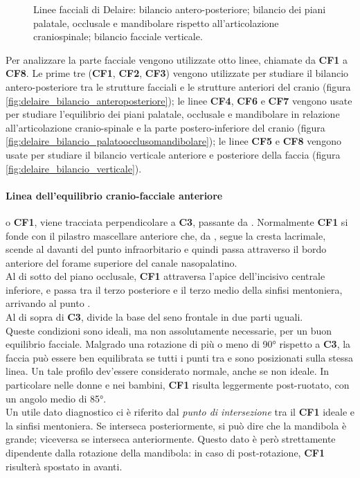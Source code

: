 \begin{figure}[!ht]
\caption{Linee facciali di Delaire:  bilancio antero-posteriore;  bilancio dei piani palatale, occlusale e mandibolare rispetto all'articolazione craniospinale;  bilancio facciale verticale.}
\label{fig:delaire_facciali}
\end{figure}

Per analizzare la parte facciale vengono utilizzate otto linee, chiamate da \textbf{CF1} a \textbf{CF8}. Le prime tre (\textbf{CF1}, \textbf{CF2}, \textbf{CF3}) vengono utilizzate per studiare il bilancio antero-posteriore tra le strutture facciali e le strutture anteriori del cranio (figura \vref{fig:delaire_bilancio_anteroposteriore}); le linee \textbf{CF4}, \textbf{CF6} e \textbf{CF7} vengono usate per studiare l'equilibrio dei piani palatale, occlusale e mandibolare in relazione all'articolazione cranio-spinale e la parte postero-inferiore del cranio (figura \vref{fig:delaire_bilancio_palatoocclusomandibolare}); le linee \textbf{CF5} e \textbf{CF8} vengono usate per studiare il bilancio verticale anteriore e posteriore della faccia (figura \vref{fig:delaire_bilancio_verticale}).

\paragraph{Linea dell'equilibrio cranio-facciale anteriore} o \textbf{CF1}, viene tracciata perpendicolare a \textbf{C3}, passante da . Normalmente \textbf{CF1} si fonde con il pilastro mascellare anteriore che, da , segue la cresta lacrimale, scende al davanti del punto infraorbitario e quindi passa attraverso il bordo anteriore del forame superiore del canale nasopalatino. \\ Al di sotto del piano occlusale, \textbf{CF1} attraversa l'apice dell'incisivo centrale inferiore, e passa tra il terzo posteriore e il terzo medio della sinfisi mentoniera, arrivando al punto . \\ Al di sopra di \textbf{C3}, divide la base del seno frontale in due parti uguali. \\ Queste condizioni sono ideali, ma non assolutamente necessarie, per un buon equilibrio facciale. Malgrado una rotazione di più o meno di 90° rispetto a \textbf{C3}, la faccia può essere ben equilibrata se tutti i punti tra  e  sono posizionati sulla stessa linea. Un tale profilo dev'essere considerato normale, anche se non ideale. In particolare nelle donne e nei bambini, \textbf{CF1} risulta leggermente post-ruotato, con un angolo medio di 85°. \\ Un utile dato diagnostico ci è riferito dal \emph{punto di intersezione} tra il \textbf{CF1} ideale e la sinfisi mentoniera. Se interseca posteriormente, si può dire che la mandibola è grande; viceversa se interseca anteriormente. Questo dato è però strettamente dipendente dalla rotazione della mandibola: in caso di post-rotazione, \textbf{CF1} risulterà spostato in avanti.

